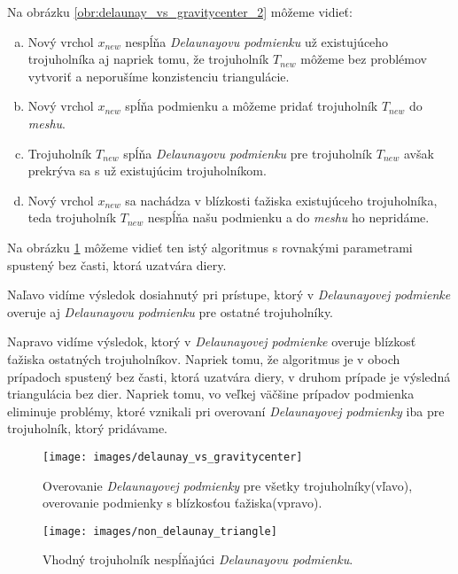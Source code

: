 \begin{enumerate}
{         Na obrázku \ref{obr:delaunay_vs_gravitycenter_2} môžeme vidieť:
         \begin{enumerate}[a)]
            \item{
                Nový vrchol $x_{new}$ nespĺňa \textit{Delaunayovu podmienku} už existujúceho trojuholníka aj 
                napriek tomu, že trojuholník $T_{new}$ môžeme bez problémov vytvoriť a 
                neporušíme konzistenciu triangulácie.
            }
            \item{
                Nový vrchol $x_{new}$ spĺňa podmienku a môžeme pridať trojuholník $T_{new}$ do \textit{meshu}.
            }
            \item{
                Trojuholník $T_{new}$ spĺňa \textit{Delaunayovu podmienku} pre trojuholník $T_{new}$ 
                avšak prekrýva sa s už existujúcim trojuholníkom.
            }
            \item{
                Nový vrchol $x_{new}$ sa nachádza v blízkosti ťažiska existujúceho trojuholníka, 
                teda trojuholník $T_{new}$ nespĺňa našu podmienku a do \textit{meshu} ho nepridáme. 
            }
         \end{enumerate}


         Na obrázku \ref{obr:delaunay_vs_gravitycenter} môžeme vidieť ten 
         istý algoritmus s rovnakými parametrami spustený bez časti, ktorá uzatvára diery. 
         
         Naľavo vidíme výsledok dosiahnutý pri prístupe, ktorý v \textit{Delaunayovej podmienke} overuje aj
         \textit{Delaunayovu podmienku} pre ostatné trojuholníky. 
         
         Napravo vidíme výsledok, ktorý v \textit{Delaunayovej podmienke} 
         overuje blízkosť ťažiska ostatných trojuholníkov. Napriek tomu, že algoritmus
         je v oboch prípadoch spustený bez časti, ktorá uzatvára diery, v druhom prípade je výsledná 
         triangulácia bez dier. Napriek tomu, vo veľkej väčšine prípadov podmienka eliminuje problémy, 
         ktoré vznikali pri overovaní \textit{Delaunayovej podmienky} iba pre trojuholník, ktorý pridávame.
     }

    \begin{figure}
        \centerline{\texttt{[image: images/delaunay\_vs\_gravitycenter]}}
        \caption[Delaunayova podmienka verzus podmienka overujúca blízkosť ťažiska]
        {Overovanie \textit{Delaunayovej podmienky} pre všetky trojuholníky(vľavo), overovanie
        podmienky s blízkosťou ťažiska(vpravo).}
        \label{obr:delaunay_vs_gravitycenter}
    \end{figure}

    \begin{figure}
        \centerline{\texttt{[image: images/non\_delaunay\_triangle]}}
        \caption[Trojuholník nespĺňajúci Delaunayovu podmienku]
        {Vhodný trojuholník nespĺňajúci \textit{Delaunayovu podmienku}.}
        \label{obr:non_delaunay_triangle}
    \end{figure}
\end{enumerate}
